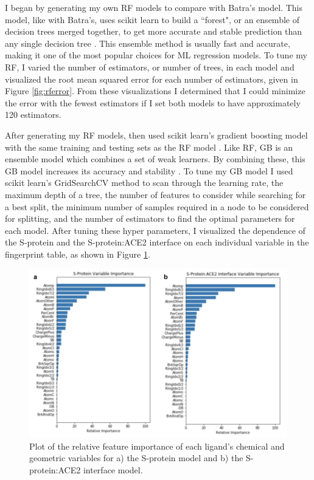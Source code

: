 \documentclass[11pt]{article}
\begin{document}
  I began by generating my own RF models to compare with Batra's model. This model, like with Batra's, uses scikit learn to build a ``forest", or an ensemble of decision trees merged together, to get more accurate and stable prediction than any single decision tree \cite{scikit}. This ensemble method is usually fast and accurate, making it one of the most popular choices for ML regression models. To tune my RF, I varied the number of estimators, or number of trees, in each model and visualized the root mean squared error for each number of estimators, given in Figure \ref{fig:rferror}. From these visualizations I determined that I could minimize the error with the fewest estimators if I set both models to have approximately 120 estimators.
  
  After generating my RF models, then used scikit learn's gradient boosting model with the same training and testing sets as the RF model \cite{scikit}. Like RF, GB is an ensemble model which combines a set of weak learners. By combining these, this GB model increases its accuracy and stability \cite{gbmodel}. To tune my GB model I used scikit learn's GridSearchCV method to scan through the learning rate, the maximum depth of a tree, the number of features to consider while searching for a best split, the minimum number of samples required in a node to be considered for splitting, and the number of estimators to find the optimal parameters for each model. After tuning these hyper parameters, I visualized the dependence of the S-protein and the S-protein:ACE2 interface on each individual variable in the fingerprint table, as shown in Figure \ref{fig:vardep}. 
  
   \begin{figure}
     \centering
     \includegraphics[width=130mm]{vardep}
     \caption{Plot of the relative feature importance of each ligand's chemical and geometric variables for a) the S-protein model and b) the S-protein:ACE2 interface model.}
     \label{fig:vardep}
   \end{figure} 
  
\end{document}
